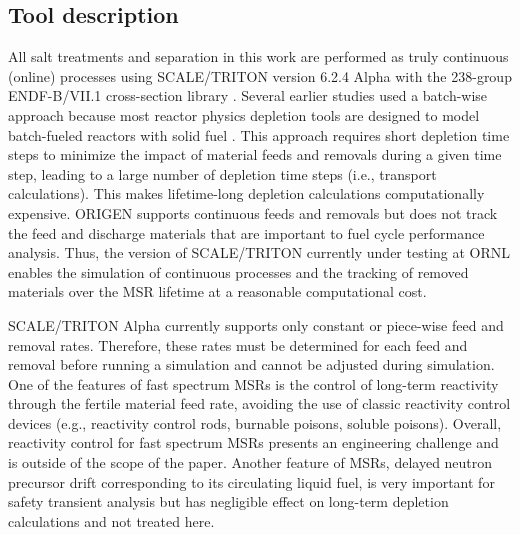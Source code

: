 \documentclass[letterpaper]{mandc2019}
\begin{document}
\subsection{Tool description}
All salt treatments and separation in this work are performed as truly continuous (online) processes using SCALE/TRITON version 6.2.4 Alpha \cite{betzler_implementation_2017-1} with the 238-group ENDF-B/VII.1 cross-section library \cite{rearden_scale_2016}. Several earlier studies used a batch-wise approach because most reactor physics depletion tools are designed to model batch-fueled reactors with solid fuel \cite{betzler_molten_2017,rykhlevskii_online_2017,rykhlevskii_modeling_2019}. This approach requires short depletion time steps to minimize the impact of material feeds and removals during a given time step, leading to a large number of depletion time steps (i.e., transport calculations). This makes lifetime-long depletion calculations computationally expensive. ORIGEN \cite{gauld_isotopic_2011} supports continuous feeds and removals but does not track the feed and discharge materials that are important to fuel cycle performance analysis. Thus, the version of SCALE/TRITON currently under testing at \gls{ORNL} enables the simulation of continuous processes and the tracking of removed materials over the \gls{MSR} lifetime at a reasonable computational cost. \par
SCALE/TRITON Alpha currently supports only constant or piece-wise feed and removal rates. Therefore, these rates must be determined for each feed and removal before running a simulation and cannot be adjusted during simulation. One of the features of fast spectrum \gls{MSR}s is the control of long-term reactivity through the fertile material feed rate, avoiding the use of classic reactivity control devices (e.g., reactivity control rods, burnable poisons, soluble poisons). Overall, reactivity control for fast spectrum \gls{MSR}s presents an engineering challenge and is outside of the scope of the paper. Another feature of \gls{MSR}s, delayed neutron precursor drift corresponding to its circulating liquid fuel, is very important for safety transient analysis but has negligible effect on long-term depletion calculations and  not treated here. 
\end{document}
